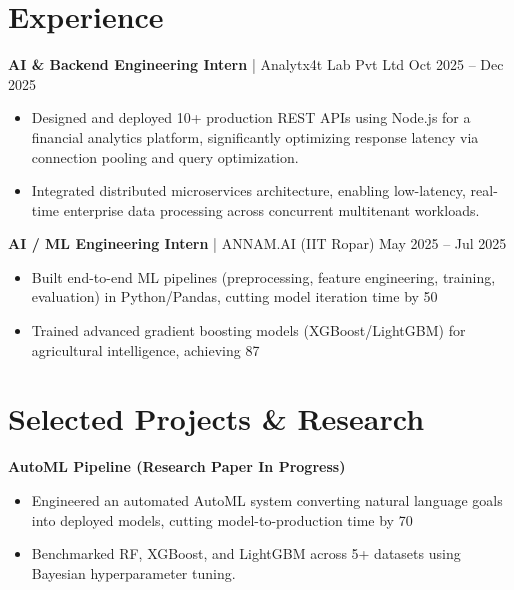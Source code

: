 \documentclass[10pt, letterpaper]{article}
\begin{document}
\section*{Experience}

\textbf{AI & Backend Engineering Intern} | Analytx4t Lab Pvt Ltd \hfill Oct 2025 – Dec 2025 \\
\begin{itemize}[leftmargin=*, itemsep=2pt]
    \item Designed and deployed 10+ production REST APIs using Node.js for a financial analytics platform, significantly optimizing response latency via connection pooling and query optimization.
    \item Integrated distributed microservices architecture, enabling low-latency, real-time enterprise data processing across concurrent multitenant workloads.
\end{itemize}

\textbf{AI / ML Engineering Intern} | ANNAM.AI (IIT Ropar) \hfill May 2025 – Jul 2025 \\
\begin{itemize}[leftmargin=*, itemsep=2pt]
    \item Built end-to-end ML pipelines (preprocessing, feature engineering, training, evaluation) in Python/Pandas, cutting model iteration time by 50%
    \item Trained advanced gradient boosting models (XGBoost/LightGBM) for agricultural intelligence, achieving 87%
\end{itemize}

\section*{Selected Projects & Research}

\textbf{AutoML Pipeline (Research Paper In Progress)}
\begin{itemize}[leftmargin=*, itemsep=1pt]
    \item Engineered an automated AutoML system converting natural language goals into deployed models, cutting model-to-production time by 70%
    \item Benchmarked RF, XGBoost, and LightGBM across 5+ datasets using Bayesian hyperparameter tuning.
\end{itemize}
\end{document}
